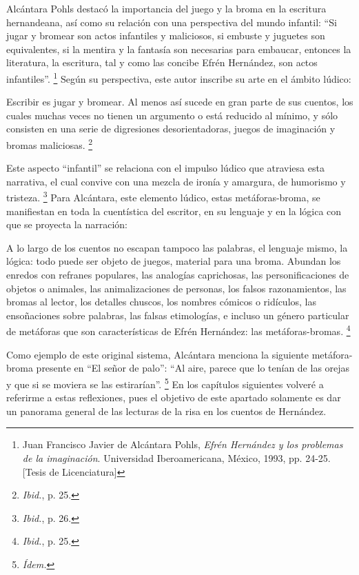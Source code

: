 \documentclass[14pt,twoside,final]{extbook} %
\let\oldfootnote\footnote
\renewcommand\footnote[1]{%
\oldfootnote{\hspace{1mm}#1}}
\begin{document}
Alcántara Pohls destacó la importancia del juego y la broma en la escritura hernandeana, así como su relación con una perspectiva del mundo infantil: ``Si jugar y bromear son actos infantiles y maliciosos, si embuste y juguetes son equivalentes, si la mentira y la fantasía son necesarias para embaucar, entonces la literatura, la escritura, tal y como las concibe Efrén Hernández, son actos infantiles''.\footnote{Juan Francisco Javier de Alcántara Pohls, \emph{Efrén Hernández y los problemas de la imaginación}. Universidad Iberoamericana, México, 1993, pp. 24-25. [Tesis de Licenciatura]} Según su perspectiva, este autor inscribe su arte en el ámbito lúdico: 
\begin{quoting}
Escribir es jugar y bromear. Al menos así sucede en gran parte de sus cuentos, los cuales muchas veces no tienen un argumento o está reducido al mínimo, y sólo consisten en una serie de digresiones desorientadoras, juegos de imaginación y bromas maliciosas.\footnote{\emph{Ibid.}, p. 25.}
\end{quoting}
Este aspecto ``infantil'' se relaciona con el impulso lúdico que atraviesa esta narrativa, el cual convive con una mezcla de ironía y amargura, de humorismo y tristeza.\footnote{\emph{Ibid.}, p. 26.} Para Alcántara, este elemento lúdico, estas \mbox{metáforas-broma}, se manifiestan en toda la cuentística del escritor, en su lenguaje y en la lógica con que se proyecta la narración:
\begin{quoting}
A lo largo de los cuentos no escapan tampoco las palabras, el lenguaje mismo, la lógica: todo puede ser objeto de juegos, material para una broma. Abundan los enredos con refranes populares, las analogías caprichosas, las personificaciones de objetos o animales, las animalizaciones de personas, los falsos razonamientos, las bromas al lector, los detalles chuscos, los nombres cómicos o ridículos, las ensoñaciones sobre palabras, las falsas etimologías, e incluso un género particular de metáforas que son características de Efrén Hernández: las metáforas-bromas.\footnote{\emph{Ibid.}, p. 25.}
\end{quoting}
Como ejemplo de este original sistema, Alcántara menciona la siguiente metáfora-broma presente en ``El señor de palo'': ``Al aire, parece que lo tenían de las orejas y que si se moviera se las estirarían''.\footnote{\em Ídem.} En los capítulos siguientes volveré a referirme a estas reflexiones, pues el objetivo de este apartado solamente es dar un panorama general de las lecturas de la risa en los cuentos de Hernández.
\end{document}
